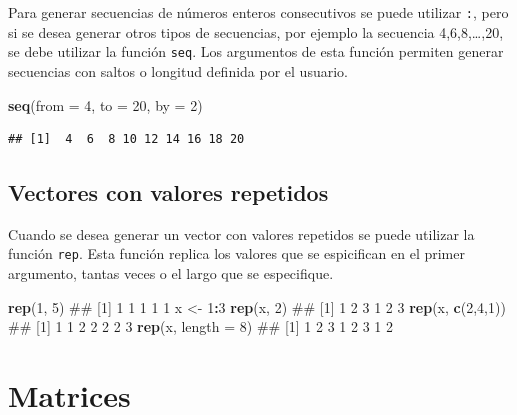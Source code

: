 \documentclass[]{book}
\newenvironment{Shaded}{\begin{snugshade}}{\end{snugshade}}
\newcommand{\KeywordTok}[1]{\textcolor[rgb]{0.13,0.29,0.53}{\textbf{#1}}}
\newcommand{\DataTypeTok}[1]{\textcolor[rgb]{0.13,0.29,0.53}{#1}}
\newcommand{\DecValTok}[1]{\textcolor[rgb]{0.00,0.00,0.81}{#1}}
\newcommand{\StringTok}[1]{\textcolor[rgb]{0.31,0.60,0.02}{#1}}
\newcommand{\OperatorTok}[1]{\textcolor[rgb]{0.81,0.36,0.00}{\textbf{#1}}}
\newcommand{\NormalTok}[1]{#1}
\begin{document}
Para generar secuencias de números enteros consecutivos se puede
utilizar \texttt{:}, pero si se desea generar otros tipos de secuencias,
por ejemplo la secuencia 4,6,8,\ldots{},20, se debe utilizar la función
\texttt{seq}. Los argumentos de esta función permiten generar secuencias
con saltos o longitud definida por el usuario.

\begin{Shaded}
\begin{Highlighting}[]
\KeywordTok{seq}\NormalTok{(}\DataTypeTok{from =} \DecValTok{4}\NormalTok{, }\DataTypeTok{to =} \DecValTok{20}\NormalTok{, }\DataTypeTok{by =} \DecValTok{2}\NormalTok{)}
\end{Highlighting}
\end{Shaded}

\begin{verbatim}
## [1]  4  6  8 10 12 14 16 18 20
\end{verbatim}

\subsection{Vectores con valores
repetidos}\label{vectores-con-valores-repetidos}

Cuando se desea generar un vector con valores repetidos se puede
utilizar la función \texttt{rep}. Esta función replica los valores que
se espicifican en el primer argumento, tantas veces o el largo que se
especifique.

\begin{Shaded}
\begin{Highlighting}[]
\KeywordTok{rep}\NormalTok{(}\DecValTok{1}\NormalTok{, }\DecValTok{5}\NormalTok{)}
\NormalTok{## [1] 1 1 1 1 1}
\NormalTok{x <-}\StringTok{ }\DecValTok{1}\OperatorTok{:}\DecValTok{3}
\KeywordTok{rep}\NormalTok{(x, }\DecValTok{2}\NormalTok{)}
\NormalTok{## [1] 1 2 3 1 2 3}
\KeywordTok{rep}\NormalTok{(x, }\KeywordTok{c}\NormalTok{(}\DecValTok{2}\NormalTok{,}\DecValTok{4}\NormalTok{,}\DecValTok{1}\NormalTok{))}
\NormalTok{## [1] 1 1 2 2 2 2 3}
\KeywordTok{rep}\NormalTok{(x, }\DataTypeTok{length =} \DecValTok{8}\NormalTok{)}
\NormalTok{## [1] 1 2 3 1 2 3 1 2}
\end{Highlighting}
\end{Shaded}

\section{Matrices}\label{matrices}
\end{document}
